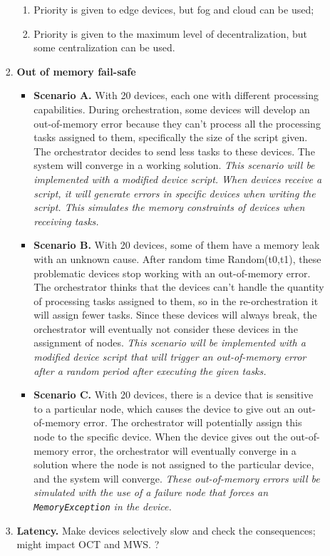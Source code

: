 \begin{enumerate}
\begin{enumerate}
\begin{enumerate}
\begin{enumerate}
                            \item Priority is given to edge devices, but fog and cloud can be used;
                            \item Priority is given to the maximum level of decentralization, but some centralization can be used.
                        \end{enumerate}
                    \item \textbf{Out of memory fail-safe}
                        \begin{itemize}
                            \item \textbf{Scenario A.} With 20 devices, each one with different processing capabilities. During orchestration, some devices will develop an out-of-memory error because they can't process all the processing tasks assigned to them, specifically the size of the script given. The orchestrator decides to send less tasks to these devices. The system will converge in a working solution. \textit{This scenario will be implemented with a modified device script. When devices receive a script, it will generate errors in specific devices when writing the script. This simulates the memory constraints of devices when receiving tasks.}
                            \item \textbf{Scenario B.} With 20 devices, some of them have a memory leak with an unknown cause. After random time Random(t0,t1), these problematic devices stop working with an out-of-memory error. The orchestrator thinks that the devices can't handle the quantity of processing tasks assigned to them, so in the re-orchestration it will assign fewer tasks. Since these devices will always break, the orchestrator will eventually not consider these devices in the assignment of nodes. \textit{This scenario will be implemented with a modified device script that will trigger an out-of-memory error after a random period after executing the given tasks.}
                            \item \textbf{Scenario C.} With 20 devices, there is a device that is sensitive to a particular node, which causes the device to give out an out-of-memory error. The orchestrator will potentially assign this node to the specific device. When the device gives out the out-of-memory error, the orchestrator will eventually converge in a solution where the node is not assigned to the particular device, and the system will converge.  \textit{These out-of-memory errors will be simulated with the use of a failure node that forces an \texttt{MemoryException} in the device.}
                        \end{itemize}
                    \item \textbf{Latency.} Make devices selectively slow and check the consequences; might impact OCT and MWS. ?
                \end{enumerate}
        \end{enumerate}
\end{enumerate}


